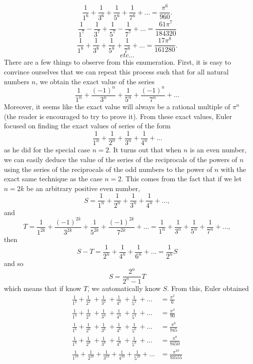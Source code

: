 \begin{equation}\label{zeta-6 but only odd numbers}
    \frac{1}{1^6} + \frac{1}{3^6} + \frac{1}{5^6} + \frac{1}{7^6} + \dots = \frac{\pi^6}{960}.
\end{equation}
\begin{equation} \label{closely zeta-7}
    \frac{1}{1^7} - \frac{1}{3^7} + \frac{1}{5^7} - \frac{1}{7^7} + \dots = \frac{61\pi^7}{184320}
\end{equation}
\begin{equation}\label{zeta-8 but only odd numbers}
    \frac{1}{1^8} + \frac{1}{3^8} + \frac{1}{5^8} + \frac{1}{7^8} + \dots = \frac{17\pi^8}{161280}.
\end{equation}
$$etc ...$$
There are a few things to observe from this enumeration. First, it is easy to convince ourselves that we can repeat this process such that for all natural numbers $n$, we obtain the exact value of the series
\begin{equation} \label{series found by euler}
    \frac{1}{1^n} + \frac{(-1)^n}{3^n} + \frac{1}{5^n} + \frac{(-1)^n}{7^n} + \dots
\end{equation}
Moreover, it seems like the exact value will always be a rational multiple of $\pi^n$ (the reader is encouraged to try to prove it). From these exact values, Euler focused on finding the exact values of series of the form
$$\frac{1}{1^n} + \frac{1}{2^n} + \frac{1}{3^n} + \frac{1}{4^n} + \dots$$
as he did for the special case $n=2$. It turns out that when $n$ is an even number, we can easily deduce the value of the series of the reciprocals of the powers of $n$ using the series of the reciprocals of the odd numbers to the power of $n$ with the exact same technique as the case $n=2$. This comes from the fact that if we let $n = 2k$ be an arbitrary positive even number, 
$$S = \frac{1}{1^{n}} + \frac{1}{2^{n}} + \frac{1}{3^{n}} + \frac{1}{4^{n}} + \dots,$$
and 
$$T = \frac{1}{1^{2k}} + \frac{(-1)^{2k}}{3^{2k}} + \frac{1}{5^{2k}} + \frac{(-1)^{2k}}{7^{2k}} + \dots = \frac{1}{1^{n}} + \frac{1}{3^{n}} + \frac{1}{5^{n}} + \frac{1}{7^{n}} + \dots,$$
then 
$$S - T = \frac{1}{2^{n}} + \frac{1}{4^{n}} + \frac{1}{6^{n}} + \dots = \frac{1}{2^{n}}S$$
and so
$$S = \frac{2^n}{2^n - 1}T$$
which means that if know $T$, we automatically know $S$. From this, Euler obtained
\begin{align}
    \frac{1}{1^2} + \frac{1}{2^2} \ + \frac{1}{3^2} \ + \frac{1}{4^2} \ + \frac{1}{5^2} \ + \dots &= \frac{\pi^2}{6} \label{zeta-2} \\
    \frac{1}{1^4} + \frac{1}{2^4} \ + \frac{1}{3^4} \ + \frac{1}{4^4} \ + \frac{1}{5^4} \ + \dots &= \frac{\pi^4}{90} \label{zeta-4} \\
    \frac{1}{1^6} + \frac{1}{2^6} \ + \frac{1}{3^6} \ + \frac{1}{4^6} \ + \frac{1}{5^6} \ + \dots &= \frac{\pi^6}{945} \label{zeta-6} \\
    \frac{1}{1^8} + \frac{1}{2^8} \ + \frac{1}{3^8} \ + \frac{1}{4^8} \ + \frac{1}{5^8} \ + \dots &
    = \frac{\pi^8}{9450} \label{zeta-8} \\
    \frac{1}{1^{10}} + \frac{1}{2^{10}} + \frac{1}{3^{10}} + \frac{1}{4^{10}} + \frac{1}{5^{10}} + \dots &= \frac{\pi^{10}}{93555} \label{zeta-10}
\end{align}
